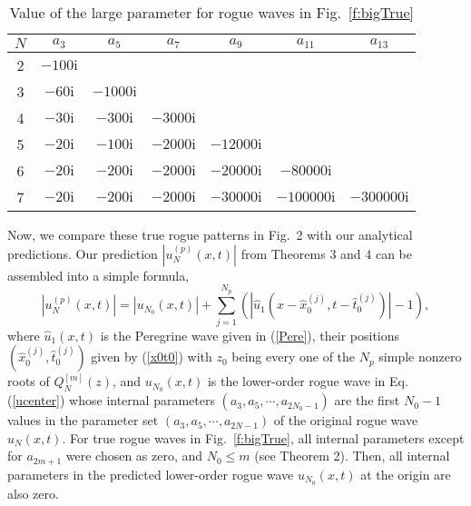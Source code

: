 \documentclass[amsmath,amssymb]{revtex4}
\begin{document}
\begin{table}[h]
\caption{Value of the large parameter for rogue waves in Fig.~\ref{f:bigTrue}}
\begin{center}
  \begin{tabular}{ | c | c | c|  c | c|  c | c|}  \hline
         $N$ &              $a_{3}$   & $a_{5}$    & $a_{7}$   & $a_{9}$   & $a_{11}$   & $a_{13}$   \\ \hline
          2 &               $-100 \textrm{i}$  &    &   &   &   &     \\ \hline
          3 &             $-60 \textrm{i}$  &  $-1000 \textrm{i}$ &     &   &   &    \\ \hline
          4 &              $-30 \textrm{i}$  &  $-300 \textrm{i}$ & $-3000 \textrm{i}$ &   &   &     \\ \hline
          5 &               $-20 \textrm{i}$  &  $-100 \textrm{i}$ & $-2000 \textrm{i}$ &$-12000 \textrm{i}$ & & \\ \hline
          6 &              $-20 \textrm{i}$  &  $-200 \textrm{i}$ & $ -2000 \textrm{i}$ &$-20000 \textrm{i}$ & $-80000 \textrm{i}$ &     \\ \hline
          7 &             $-20 \textrm{i}$  &  $-200 \textrm{i}$ & $ -2000 \textrm{i}$ &$-30000 \textrm{i}$ & $-100000 \textrm{i}$ & $-300000 \textrm{i}$   \\ \hline
  \end{tabular}
\end{center}
\end{table}

Now, we compare these true rogue patterns in Fig.~2 with our analytical predictions. Our prediction $|u_{N}^{(p)}(x,t)|$ from Theorems 3 and 4 can be assembled into a simple formula,
\begin{equation} \label{upNLS}
\left|u_{N}^{(p)}(x,t)\right|=\left|u_{N_{0}}(x,t)\right| + \sum _{j=1}^{N_{p}}  \left(\left| \hat{u}_1(x-\hat{x}_{0}^{(j)}, t-\hat{t}_{0}^{(j)})\right| -1 \right),
\end{equation}
where $\hat{u}_1(x,t)$ is the Peregrine wave given in (\ref{Pere}), their positions $(\hat{x}_{0}^{(j)}, \hat{t}_{0}^{(j)})$ given by (\ref{x0t0}) with $z_0$ being every one of the $N_p$ simple nonzero roots of $Q_{N}^{[m]}(z)$, and $u_{N_0}(x,t)$ is the lower-order rogue wave in Eq. (\ref{ucenter}) whose internal parameters $(a_{3}, a_{5}, \cdots, a_{2N_{0}-1})$ are the first $N_0-1$ values in the parameter set $(a_3, a_5, \cdots, a_{2N-1})$ of the original rogue wave $u_N(x,t)$. For true rogue waves in Fig.~\ref{f:bigTrue}, all internal parameters except for $a_{2m+1}$ were chosen as zero, and $N_0\le m$ (see Theorem 2). Then, all internal parameters in the predicted lower-order rogue wave $u_{N_{0}}(x,t)$ at the origin are also zero.
\end{document}
